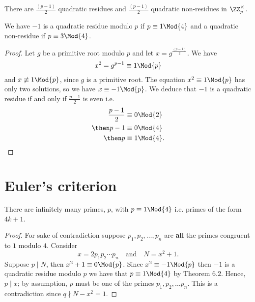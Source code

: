 \documentclass[12pt, a4paper]{article}
\begin{document}
\begin{corollary}
    There are \(\frac{(p-1)}{2}\) quadratic residues and \(\frac{(p-1)}{2}\) quadratic non-residues in \(\ZZ_p^{\times}\).
\end{corollary}

\begin{mdthm}
    We have \(-1\) is a quadratic residue modulo \(p\) if \(p \equiv 1 \Mod{4}\) and a quadratic non-residue if \(p \equiv 3 \Mod{4}\).
\end{mdthm}

\begin{proof}
    Let \(g\) be a primitive root modulo \(p\) and let \(x=g^{\frac{(p-1)}{2}}\). We have
    \[\begin{aligned}
        x^2 = g^{p-1} \equiv 1 \Mod{p}
    \end{aligned}\]
    and \(x \not\equiv 1 \Mod{p}\), since \(g\) is a primitive root. The equation \(x^2 \equiv 1 \Mod{p}\) has only two solutions, so we have \(x\equiv -1 \Mod{p}\). We deduce that \(-1\) is a quadratic residue if and only if \(\frac{p-1}{2}\) is even i.e. 
    \[\begin{aligned}
    \frac{p-1}{2} &\equiv 0 \Mod{2} \\
    \then p-1 &\equiv 0 \Mod{4} \\
    \then p &\equiv 1 \Mod{4}.
    \end{aligned}\]
\end{proof}

\section{Euler's criterion}

\begin{theorem}
    There are infinitely many primes, \(p\), with \(p \equiv 1 \Mod{4}\) i.e. primes of the form \(4k+1\).
\end{theorem}

\begin{proof}
    For sake of contradiction suppose \(p_1,p_2,\ldots,p_n\) are \textbf{all} the primes congruent to \(1\) modulo \(4\). Consider
    \[x=2p_1p_2\cdots p_n \quad \text{and} \quad N=x^2+1.\]
    Suppose \(p\mid N\), then \(x^2+1 \equiv 0 \Mod{p}\). Since \(x^2 \equiv -1 \Mod{p}\) then \(-1\) is a quadratic residue modulo \(p\) we have that \(p \equiv 1 \Mod{4}\) by Theorem \(6.2\). Hence, \(p \mid x\); by assumption, \(p\) must be one of the primes \(p_1,p_2,\ldots p_n\). This is a contradiction since \(q \nmid N-x^2 =1\).
\end{proof}
\end{document}
